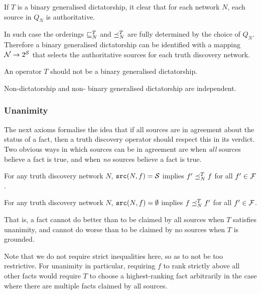 \documentclass[../main.tex]{subfiles}
\begin{document}
\begin{remark}
If $T$ is a binary generalised dictatorship, it clear that for each network
$N$, each source in $Q_N$ is authoritative.

In such case the orderings $\sqsubseteq_N^T$ and $\preceq_N^T$ are fully determined by
the choice of $Q_N$. Therefore a binary generalised dictatorship can be
identified with a mapping $\mathcal{N} \rightarrow 2^{\mathcal{S}}$ that selects the authoritative
sources for each truth discovery network.
\end{remark}

\begin{axiom}
\label{axiom:non_bin_gen_dict}
An operator $T$ should not be a binary generalised dictatorship.
\end{axiom}

\begin{proposition}
\label{prop:non_dict_and_non_bin_gen_dict_indep}
Non-dictatorship and non- binary generalised dictatorship are independent.
\end{proposition}

\subsubsection*{Unanimity}

The next axioms formalise the idea that if all sources are in agreement about
the status of a fact, then a truth discovery operator should respect this in
its verdict. Two obvious ways in which sources can be in agreement are when
\emph{all} sources believe a fact is true, and when \emph{no} sources believe a
fact is true.

\begin{axiom}[Unanimity]
\label{axiom:unanimity}
For any truth discovery network $N$, $\texttt{src}(N, f) = \mathcal{S}$ implies $f' \preceq_N^T f$
for all $f' \in \mathcal{F}$.
\end{axiom}

\begin{axiom}[Groundedness]
\label{axiom:groundedness}
For any truth discovery network $N$, $\texttt{src}(N, f) = \emptyset$ implies $f
\preceq_N^T f'$ for all $f' \in \mathcal{F}$.
\end{axiom}

That is, a fact cannot do better than to be claimed by all sources when $T$
satisfies unanimity, and cannot do worse than to be claimed by no sources when
$T$ is grounded.

Note that we do not require strict inequalities here, so as to not be too
restrictive. For unanimity in particular, requiring $f$ to rank strictly above
all other facts would require $T$ to choose a highest-ranking fact arbitrarily
in the case where there are multiple facts claimed by all sources.
\end{document}
